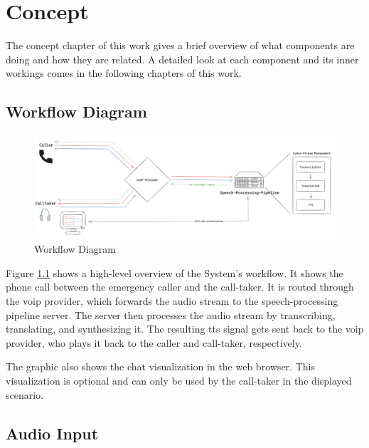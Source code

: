 \chapter{Concept}

\label{Concept}

The concept chapter of this work gives a brief overview of what components are doing and how they are related. 
A detailed look at each component and its inner workings comes in the following chapters of this work.


\section{Workflow Diagram}

\begin{figure}[ht]
	\includegraphics[width=\textwidth]{Figures/data-flow-chart.png}
	\caption{Workflow Diagram}
	\label{fig:workflowDiagram}
\end{figure}

Figure \ref{fig:workflowDiagram} shows a high-level overview of the System's workflow. It shows the phone call between 
the emergency caller and the call-taker. It is routed through the \ac{voip} provider, which forwards the audio stream to 
the speech-processing pipeline server. The server then processes the audio stream by transcribing, translating, and 
synthesizing it. The resulting tts signal gets sent back to the \ac{voip} provider, who plays it back to the caller and 
call-taker, respectively.

The graphic also shows the chat visualization in the web browser. This visualization is optional and can only be used 
by the call-taker in the displayed scenario.


\section{Audio Input}

